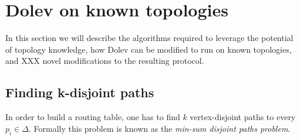 




\section{Dolev on known topologies}
In this section we will describe the algorithms required to leverage the potential of topology knowledge, how Dolev can be modified to run on known topologies, and XXX novel modifications to the resulting protocol.

\subsection{Finding k-disjoint paths}
In order to build a routing table, one has to find $k$ vertex-disjoint paths to every $p_i \in \Delta$. Formally this problem is known as the \textit{min-sum disjoint paths problem}.

